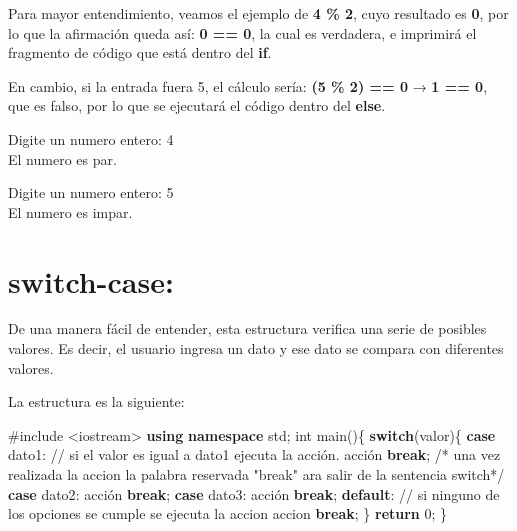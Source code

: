 \documentclass[
  11pt,
  a4paper,
  DIV=11,
  numbers=noendperiod]{scrreprt}
\newenvironment{Shaded}{\begin{snugshade}}{\end{snugshade}}
\newcommand{\CommentTok}[1]{\textcolor[rgb]{0.37,0.37,0.37}{#1}}
\newcommand{\ControlFlowTok}[1]{\textcolor[rgb]{0.00,0.23,0.31}{\textbf{#1}}}
\newcommand{\DataTypeTok}[1]{\textcolor[rgb]{0.68,0.00,0.00}{#1}}
\newcommand{\DecValTok}[1]{\textcolor[rgb]{0.68,0.00,0.00}{#1}}
\newcommand{\ImportTok}[1]{\textcolor[rgb]{0.00,0.46,0.62}{#1}}
\newcommand{\KeywordTok}[1]{\textcolor[rgb]{0.00,0.23,0.31}{\textbf{#1}}}
\newcommand{\NormalTok}[1]{\textcolor[rgb]{0.00,0.23,0.31}{#1}}
\newcommand{\OperatorTok}[1]{\textcolor[rgb]{0.37,0.37,0.37}{#1}}
\newcommand{\PreprocessorTok}[1]{\textcolor[rgb]{0.68,0.00,0.00}{#1}}
\begin{document}
Para mayor entendimiento, veamos el ejemplo de \textbf{4 \% 2}, cuyo
resultado es \textbf{0}, por lo que la afirmación queda así: \textbf{0
== 0}, la cual es verdadera, e imprimirá el fragmento de código que está
dentro del \textbf{if}.

En cambio, si la entrada fuera 5, el cálculo sería: \textbf{(5 \% 2) ==
0} → \textbf{1 == 0}, que es falso, por lo que se ejecutará el código
dentro del \textbf{else}.

\begin{tcolorbox}[custombox]
Digite un numero entero: 4 \\
El numero es par.
\end{tcolorbox}

\begin{tcolorbox}[custombox]
Digite un numero entero: 5 \\
El numero es impar.
\end{tcolorbox}

\section{switch-case:}\label{switch-case}

De una manera fácil de entender, esta estructura verifica una serie de
posibles valores. Es decir, el usuario ingresa un dato y ese dato se
compara con diferentes valores.

La estructura es la siguiente:

\begin{Shaded}
\begin{Highlighting}[]
\PreprocessorTok{\#include }\ImportTok{\textless{}iostream\textgreater{}}
\KeywordTok{using} \KeywordTok{namespace}\NormalTok{ std}\OperatorTok{;}
\DataTypeTok{int}\NormalTok{ main}\OperatorTok{()\{}
    \ControlFlowTok{switch}\OperatorTok{(}\NormalTok{valor}\OperatorTok{)\{}
        \ControlFlowTok{case}\NormalTok{ dato1}\OperatorTok{:} \CommentTok{// si el valor es igual a dato1 ejecuta la acción.}
\NormalTok{            acción}
            \ControlFlowTok{break}\OperatorTok{;} \CommentTok{/* una vez realizada la accion la palabra reservada "break" ara }
\CommentTok{                      salir de la sentencia switch*/}
        \ControlFlowTok{case}\NormalTok{ dato2}\OperatorTok{:}
\NormalTok{            acción}
            \ControlFlowTok{break}\OperatorTok{;}
        \ControlFlowTok{case}\NormalTok{ dato3}\OperatorTok{:}
\NormalTok{            acción}
            \ControlFlowTok{break}\OperatorTok{;}
        \ControlFlowTok{default}\OperatorTok{:}    \CommentTok{// si ninguno de los opciones se cumple se ejecuta la accion }
\NormalTok{            accion}
            \ControlFlowTok{break}\OperatorTok{;}
    \OperatorTok{\}}
    \ControlFlowTok{return} \DecValTok{0}\OperatorTok{;}
\OperatorTok{\}}
\end{Highlighting}
\end{Shaded}
\end{document}
